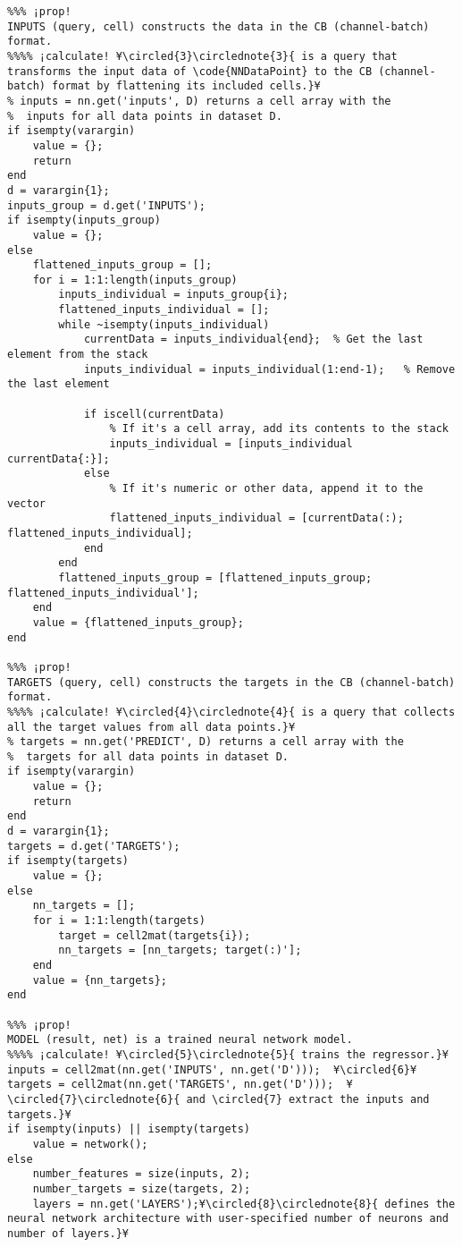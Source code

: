 \documentclass{tufte-handout}
\begin{document}
\begin{lstlisting}
%%% ¡prop!
INPUTS (query, cell) constructs the data in the CB (channel-batch) format.
%%%% ¡calculate! ¥\circled{3}\circlednote{3}{ is a query that transforms the input data of \code{NNDataPoint} to the CB (channel-batch) format by flattening its included cells.}¥
% inputs = nn.get('inputs', D) returns a cell array with the
%  inputs for all data points in dataset D.
if isempty(varargin)
    value = {};
    return
end
d = varargin{1};
inputs_group = d.get('INPUTS');
if isempty(inputs_group)
    value = {};
else
    flattened_inputs_group = [];
    for i = 1:1:length(inputs_group)
        inputs_individual = inputs_group{i};
        flattened_inputs_individual = [];
        while ~isempty(inputs_individual)
            currentData = inputs_individual{end};  % Get the last element from the stack
            inputs_individual = inputs_individual(1:end-1);   % Remove the last element

            if iscell(currentData)
                % If it's a cell array, add its contents to the stack
                inputs_individual = [inputs_individual currentData{:}];
            else
                % If it's numeric or other data, append it to the vector
                flattened_inputs_individual = [currentData(:); flattened_inputs_individual];
            end
        end
        flattened_inputs_group = [flattened_inputs_group; flattened_inputs_individual'];
    end
    value = {flattened_inputs_group};
end

%%% ¡prop!
TARGETS (query, cell) constructs the targets in the CB (channel-batch) format.
%%%% ¡calculate! ¥\circled{4}\circlednote{4}{ is a query that collects all the target values from all data points.}¥
% targets = nn.get('PREDICT', D) returns a cell array with the
%  targets for all data points in dataset D.
if isempty(varargin)
    value = {};
    return
end
d = varargin{1};
targets = d.get('TARGETS');
if isempty(targets)
    value = {};
else
    nn_targets = [];
    for i = 1:1:length(targets)
        target = cell2mat(targets{i});
        nn_targets = [nn_targets; target(:)'];
    end
    value = {nn_targets};
end

%%% ¡prop!
MODEL (result, net) is a trained neural network model.
%%%% ¡calculate! ¥\circled{5}\circlednote{5}{ trains the regressor.}¥
inputs = cell2mat(nn.get('INPUTS', nn.get('D')));  ¥\circled{6}¥
targets = cell2mat(nn.get('TARGETS', nn.get('D')));  ¥\circled{7}\circlednote{6}{ and \circled{7} extract the inputs and targets.}¥
if isempty(inputs) || isempty(targets)
    value = network();
else
    number_features = size(inputs, 2);
    number_targets = size(targets, 2);
    layers = nn.get('LAYERS');¥\circled{8}\circlednote{8}{ defines the neural network architecture with user-specified number of neurons and number of layers.}¥
    

\end{lstlisting}
\end{document}
